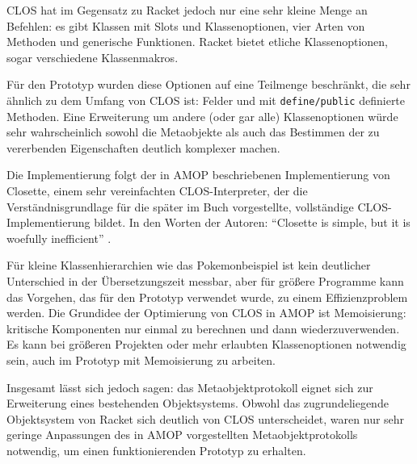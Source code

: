 CLOS hat im Gegensatz zu Racket jedoch nur eine sehr kleine Menge an Befehlen: es gibt Klassen mit Slots und Klassenoptionen, vier Arten von Methoden und generische Funktionen. Racket bietet etliche Klassenoptionen, sogar verschiedene Klassenmakros.

Für den Prototyp wurden diese Optionen auf eine Teilmenge beschränkt, die sehr ähnlich zu dem Umfang von CLOS ist: Felder und mit \texttt{define/public} definierte Methoden. Eine Erweiterung um andere (oder gar alle) Klassenoptionen würde sehr wahrscheinlich sowohl die Metaobjekte als auch das Bestimmen der zu vererbenden Eigenschaften deutlich komplexer machen. 

Die Implementierung folgt der in AMOP beschriebenen Implementierung von Closette, einem sehr vereinfachten CLOS-Interpreter, der die Verständnisgrundlage für die später im Buch vorgestellte, vollständige CLOS-Implementierung bildet. In den Worten der Autoren: ``Closette is simple, but it is woefully inefficient'' \cite[S.45]{amop}. 

Für kleine Klassenhierarchien wie das Pokemonbeispiel ist kein deutlicher Unterschied in der Übersetzungszeit messbar, aber für größere Programme kann das Vorgehen, das für den Prototyp verwendet wurde, zu einem Effizienzproblem werden. Die Grundidee der Optimierung von CLOS in AMOP ist Memoisierung: kritische Komponenten nur einmal zu berechnen und dann wiederzuverwenden. Es kann bei größeren Projekten oder mehr erlaubten Klassenoptionen notwendig sein, auch im Prototyp mit Memoisierung zu arbeiten.

Insgesamt lässt sich jedoch sagen: das Metaobjektprotokoll eignet sich zur Erweiterung eines bestehenden Objektsystems. Obwohl das zugrundeliegende Objektsystem von Racket sich deutlich von CLOS unterscheidet, waren nur sehr geringe Anpassungen des in AMOP vorgestellten Metaobjektprotokolls notwendig, um einen funktionierenden Prototyp zu erhalten.